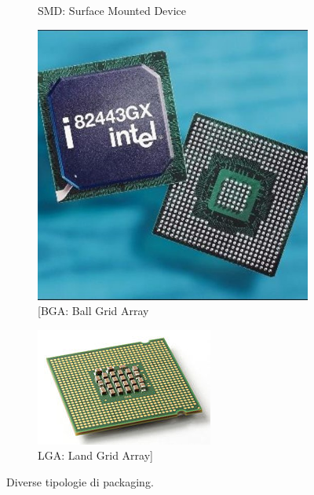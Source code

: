 \documentclass[
]{book}
\begin{document}
\begin{figure}[H]
\begin{subfigure}[b]{0.2\textwidth}
    \caption{SMD: Surface Mounted Device}
  \end{subfigure}
  \begin{subfigure}[b]{0.2\textwidth}
    \includegraphics[width=\textwidth]{immagini/32.jpg}
    \caption{[BGA: Ball Grid Array}
  \end{subfigure}
  \hspace{0.02\textwidth}
  \begin{subfigure}[b]{0.2\textwidth}
    \includegraphics[width=\textwidth]{immagini/33.jpg}
    \caption{LGA: Land Grid Array]}
\end{subfigure}
\caption{Diverse tipologie di packaging.}
\end{figure}
\end{document}
